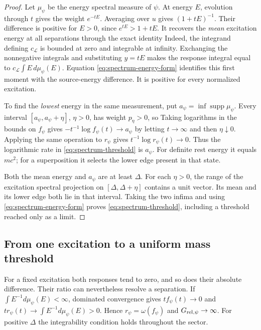 \begin{proof} Let \(\mu_\psi\) be the energy spectral measure of \(\psi\). At energy \(E\), evolution through \(t\) gives the weight \(e^{-tE}\). Averaging over \(u\) gives \((1+tE)^{-1}\). Their difference is positive for \(E>0\), since \(e^{tE}>1+tE\). It recovers the \emph{mean} excitation energy at all separations through the exact identity
\SpectrumMomentDisplay
Indeed, the integrand defining \(c_{\mathcal L}\) is bounded at zero and integrable at infinity. Exchanging the nonnegative integrals and substituting \(y=tE\) makes the response integral equal to \(c_{\mathcal L}\int E\,d\mu_\psi(E)\). Equation \eqref{eq:spectrum-energy-form} identifies this first moment with the source-energy difference. It is positive for every normalized excitation.

To find the \emph{lowest} energy in the same measurement, put \(a_\psi=\inf\operatorname{supp}\mu_\psi\). Every interval \([a_\psi,a_\psi+\eta]\), \(\eta>0\), has weight \(p_\eta>0\), so
\SpectrumSupportBoundsDisplay
Taking logarithms in the bounds on \(f_\psi\) gives \(-t^{-1}\log f_\psi(t)\to a_\psi\) by letting \(t\to\infty\) and then \(\eta\downarrow0\). Applying the same operation to \(r_\psi\) gives \(t^{-1}\log r_\psi(t)\to0\). Thus the logarithmic rate in \eqref{eq:spectrum-threshold} is \(a_\psi\). For definite rest energy it equals \(mc^2\); for a superposition it selects the lower edge present in that state.

Both the mean energy and \(a_\psi\) are at least \(\Delta\). For each \(\eta>0\), the range of the excitation spectral projection on \([\Delta,\Delta+\eta]\) contains a unit vector. Its mean and its lower edge both lie in that interval. Taking the two infima and using \eqref{eq:spectrum-energy-form} proves \eqref{eq:spectrum-threshold}, including a threshold reached only as a limit.
\end{proof}

\subsection{From one excitation to a uniform mass threshold}

For a fixed excitation both responses tend to zero, and so does their absolute difference. Their ratio can nevertheless resolve a separation. If \(\int E^{-1}d\mu_\psi(E)<\infty\), dominated convergence gives \(t f_\psi(t)\to0\) and \(t r_\psi(t)\to\int E^{-1}d\mu_\psi(E)>0\). Hence \(r_\psi=\omega(f_\psi)\) and \(G_{{\rm rel},\psi}\to\infty\). For positive \(\Delta\) the integrability condition holds throughout the sector.

